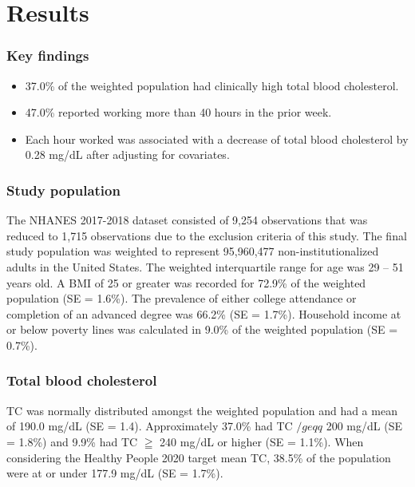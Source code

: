 \documentclass[]{elsarticle} %
\providecommand{\tightlist}{%
  \setlength{\itemsep}{0pt}\setlength{\parskip}{0pt}}
\begin{document}
\hypertarget{results}{%
\section{Results}\label{results}}

\hypertarget{key-findings}{%
\subsubsection{Key findings}\label{key-findings}}

\begin{itemize}
\tightlist
\item
  37.0\% of the weighted population had clinically high total blood
  cholesterol.
\item
  47.0\% reported working more than 40 hours in the prior week.
\item
  Each hour worked was associated with a decrease of total blood
  cholesterol by 0.28 mg/dL after adjusting for covariates.
\end{itemize}

\hypertarget{study-population-1}{%
\subsubsection{Study population}\label{study-population-1}}

The NHANES 2017-2018 dataset consisted of 9,254 observations that was
reduced to 1,715 observations due to the exclusion criteria of this
study. The final study population was weighted to represent 95,960,477
non-institutionalized adults in the United States. The weighted
interquartile range for age was 29 -- 51 years old. A BMI of 25 or
greater was recorded for 72.9\% of the weighted population (SE = 1.6\%).
The prevalence of either college attendance or completion of an advanced
degree was 66.2\% (SE = 1.7\%). Household income at or below poverty
lines was calculated in 9.0\% of the weighted population (SE = 0.7\%).

\hypertarget{total-blood-cholesterol}{%
\subsubsection{Total blood cholesterol}\label{total-blood-cholesterol}}

TC was normally distributed amongst the weighted population and had a
mean of 190.0 mg/dL (SE = 1.4). Approximately 37.0\% had TC \(/geqq\)
200 mg/dL (SE = 1.8\%) and 9.9\% had TC \(\geqq\) 240 mg/dL or higher
(SE = 1.1\%). When considering the Healthy People 2020 target mean TC,
38.5\% of the population were at or under 177.9 mg/dL (SE = 1.7\%).
\end{document}
